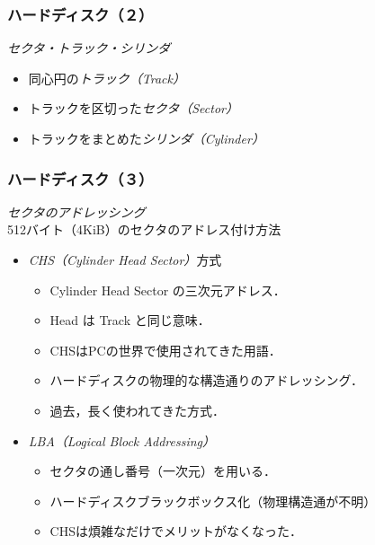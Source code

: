 \documentclass[unicode]{beamer}                   %
\begin{document}
\begin{frame}
  \frametitle{ハードディスク（２）}
  \emph{セクタ・トラック・シリンダ}
  \begin{itemize}
  \item 同心円の\emph{トラック（Track）}
  \item トラックを区切った\emph{セクタ（Sector）}
  \item トラックをまとめた\emph{シリンダ（Cylinder）}
  \end{itemize}
\end{frame}

\begin{frame}
  \frametitle{ハードディスク（３）}
  \emph{セクタのアドレッシング}\\
  512バイト（4KiB）のセクタのアドレス付け方法
  \begin{itemize}
  \item \emph{CHS（Cylinder Head Sector）}方式
    \begin{itemize}
    \item Cylinder Head Sector の三次元アドレス．
    \item Head は Track と同じ意味．
    \item CHSはPCの世界で使用されてきた用語．
    \item ハードディスクの物理的な構造通りのアドレッシング．
    \item 過去，長く使われてきた方式．
  \end{itemize}
  \item \emph{LBA（Logical Block Addressing）}
    \begin{itemize}
    \item セクタの通し番号（一次元）を用いる．
    \item ハードディスクブラックボックス化（物理構造通が不明）
    \item CHSは煩雑なだけでメリットがなくなった．
    \end{itemize}
  \end{itemize}
\end{frame}
\end{document}
